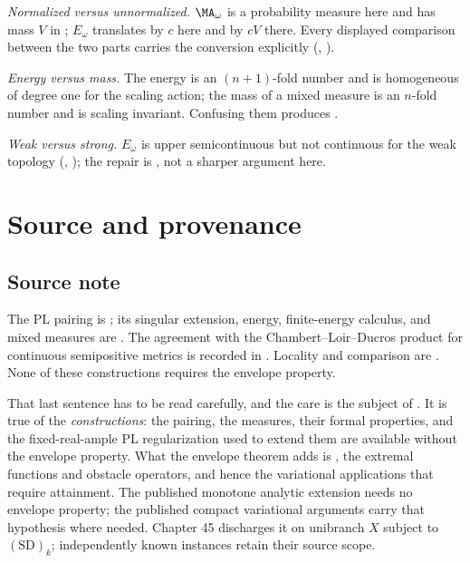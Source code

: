 \emph{Normalized versus unnormalized.}  $\MA_\omega$ is a probability
measure here and has mass $V$ in ; $E_\omega$ translates
by $c$ here and by $cV$ there.  Every displayed comparison between the
two parts carries the conversion explicitly
(,
).

\emph{Energy versus mass.}  The energy is an $(n+1)$-fold number and is
homogeneous of degree one for the scaling action; the mass of a mixed
measure is an $n$-fold number and is scaling invariant.  Confusing them
produces .

\emph{Weak versus strong.}  $E_\omega$ is upper semicontinuous but not
continuous for the weak topology
(,
); the repair is
, not a sharper argument here.

\section{Source and provenance}
\label{sec:ch46-source}

\subsection{Source note}
\label{sec:ch46-source-note}

The PL pairing is \cite[Definition~3.12 and Proposition~3.14]{BJ22}; its
singular extension, energy, finite-energy calculus, and mixed measures are
\cite[Theorem~7.1, Definition~7.6, Theorems~7.8 and~7.18, and
Proposition~7.19]{BJ22}.  The agreement with the Chambert--Loir--Ducros
product for continuous semipositive metrics is recorded in
\cite[Remark~7.23]{BJ22}.  Locality and comparison are
\cite[Theorems~7.40 and~7.44]{BJ22}.  None of these constructions requires
the envelope property.

That last sentence has to be read carefully, and the care is the subject of
.  It is true of the \emph{constructions}:
the pairing, the measures, their formal properties, and the fixed-real-ample
PL regularization used to extend them are available without the envelope
property.  What the envelope theorem adds is
, the extremal functions and obstacle operators,
and hence the variational applications that require attainment.  The
published monotone analytic extension needs no envelope property;
the published compact variational arguments carry that hypothesis where
needed. Chapter 45 discharges it on unibranch $X$ subject to
$\mathrm{(SD)}_k$; independently known instances retain their source scope.


